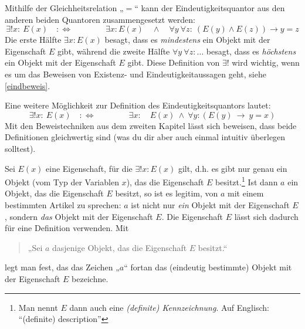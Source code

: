 \begin{bem} \label{eindquantzerlegung}
    Mithilfe der Gleichheitsrelation „$=$“ kann der Eindeutigkeitsquantor aus den anderen beiden Quantoren zusammengesetzt werden:
        \[ \exists ! x:\ E(x)\quad :\Leftrightarrow\qquad\qquad \exists x: E(x) \quad \land\quad \forall y\ \forall z:\ (E(y)\land E(z)) \to y=z \]
    Die erste Hälfte $\exists x: E(x)$ besagt, dass es \emph{mindestens} ein Objekt mit der Eigenschaft $E$ gibt, während die zweite Hälfte $\forall y\ \forall z:\dots$ besagt, dass es \emph{höchstens} ein Objekt mit der Eigenschaft $E$ gibt. Diese Definition von $\exists!$ wird wichtig, wenn es um das Beweisen von Existenz- und Eindeutigkeitaussagen geht, siehe \cref{eindbeweis}.

    Eine weitere Möglichkeit zur Definition des Eindeutigkeitsquantors lautet:
        \[ \exists ! x:\ E(x)\quad :\Leftrightarrow\qquad\qquad \exists x:\quad E(x)\ \land\ \forall y: (E(y)\ \to\ y=x) \]
    Mit den Beweistechniken aus dem zweiten Kapitel lässt sich beweisen, dass beide Definitionen gleichwertig sind (was du dir aber auch einmal intuitiv überlegen solltest).
\end{bem}


\begin{nota} \label{kennzeichnung}
    Sei $E(x)$ eine Eigenschaft, für die $\exists ! x: E(x)$ gilt, d.h. es gibt nur genau ein Objekt (vom Typ der Variablen $x$), das die Eigenschaft $E$ besitzt.\footnote{Man nennt $E$ dann auch eine \emph{(definite) Kennzeichnung}. Auf Englisch: ``(definite) description''} Ist dann $a$ ein Objekt, das die Eigenschaft $E$ besitzt, so ist es legitim, von $a$ mit einem bestimmten Artikel zu sprechen: $a$ ist nicht nur \emph{ein} Objekt mit der Eigenschaft $E$, sondern \emph{das} Objekt mit der Eigenschaft $E$. Die Eigenschaft $E$ lässt sich dadurch für eine Definition verwenden. Mit
    \begin{quote}
        „Sei $a$ dasjenige Objekt, das die Eigenschaft $E$ besitzt.“
    \end{quote}
    legt man fest, das das Zeichen „$a$“ fortan das (eindeutig bestimmte) Objekt mit der Eigenschaft $E$ bezeichne.
\end{nota}


